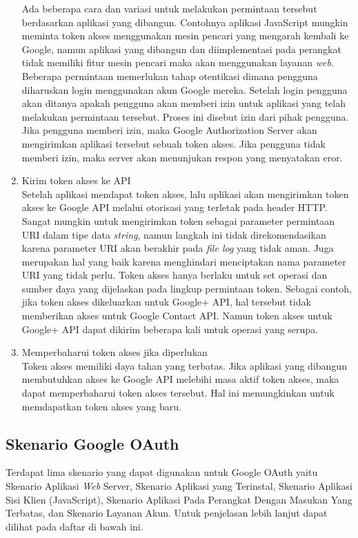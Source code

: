 \begin{enumerate}[(1)]
Ada beberapa cara dan variasi untuk melakukan permintaan tersebut berdasarkan
aplikasi yang dibangun. Contohnya aplikasi JavaScript mungkin meminta token
akses menggunakan mesin pencari yang mengarah kembali ke Google, namun aplikasi
yang dibangun dan diimplementasi pada perangkat tidak memiliki fitur mesin
pencari maka akan menggunakan layanan {\it web}. Beberapa permintaan memerlukan
tahap otentikasi dimana pengguna diharuskan login menggunakan akun Google mereka.
Setelah login pengguna akan ditanya apakah pengguna akan memberi izin untuk
aplikasi yang telah melakukan permintaan tersebut. Proses ini disebut izin dari
pihak pengguna. Jika pengguna memberi izin, maka Google Authorization Server
akan mengirimkan aplikasi tersebut sebuah token akses. Jika pengguna tidak
memberi izin, maka server akan menunjukan respon yang menyatakan eror.
\item
Kirim token akses ke API\\
Setelah aplikasi mendapat token akses, lalu aplikasi akan mengirimkan token
akses ke Google API melalui otorisasi yang terletak pada header HTTP. Sangat
mungkin untuk mengirimkan token sebagai parameter permintaan URI dalam tipe data
{\it string}, namun langkah ini tidak direkomendasikan karena parameter URI akan
berakhir pada {\it file log} yang tidak aman. Juga merupakan hal yang baik
karena menghindari menciptakan nama parameter URI yang tidak perlu. Token akses hanya
berlaku untuk set operasi dan sumber daya yang dijelaskan pada lingkup
permintaan token. Sebagai contoh, jika token akses dikeluarkan untuk Google+
API, hal tersebut tidak memberikan akses untuk Google Contact API. Namun token
akses untuk Google+ API dapat dikirim beberapa kali untuk operasi yang serupa.
\item
Memperbaharui token akses jika diperlukan\\
Token akses memiliki daya tahan yang terbatas. Jika aplikasi yang dibangun
membutuhkan akses ke Google API melebihi masa aktif token akses, maka dapat
memperbaharui token akses tersebut. Hal ini memungkinkan untuk memdapatkan token
akses yang baru.
\end{enumerate}

\subsection{Skenario Google OAuth}
Terdapat lima skenario yang dapat digunakan untuk Google OAuth yaitu
Skenario Aplikasi {\it Web} Server, Skenario Aplikasi yang Terinstal, Skenario
Aplikasi Sisi Klien (JavaScript), Skenario Aplikasi Pada Perangkat Dengan
Masukan Yang Terbatas, dan Skenario Layanan Akun. Untuk penjelasan lebih lanjut
dapat dilihat pada daftar di bawah ini.

